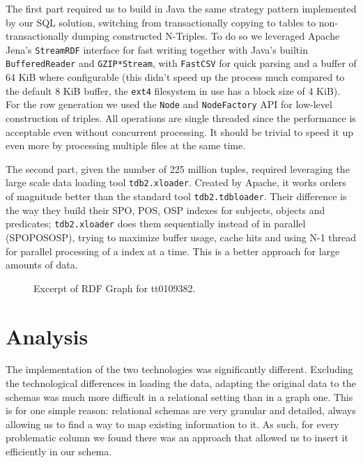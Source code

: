 \documentclass[a4paper,10pt]{article}
\begin{document}
The first part required us to build in Java the same strategy pattern
implemented by our SQL solution, switching from transactionally
copying to tables to non-transactionally dumping constructed
N-Triples. To do so we leveraged Apache Jena's \texttt{StreamRDF}
interface for fast writing together with Java's builtin
\texttt{BufferedReader} and \texttt{GZIP*Stream}, with
\texttt{FastCSV} for quick parsing and a buffer of 64 KiB where
configurable (this didn't speed up the process much compared to the
default 8 KiB buffer, the \texttt{ext4} filesystem in use has a block
size of 4 KiB). For the row generation we used the \texttt{Node} and
\texttt{NodeFactory} API for low-level construction of triples. All
operations are single threaded since the performance is acceptable
even without concurrent processing. It should be trivial to speed it
up even more by processing multiple files at the same time.

The second part, given the number of 225 million tuples, required
leveraging the large scale data loading tool \texttt{tdb2.xloader}.
Created by Apache, it works orders of magnitude better than the
standard tool \texttt{tdb2.tdbloader}. Their difference is the way
they build their SPO, POS, OSP indexes for subjects, objects and
predicates; \texttt{tdb2.xloader} does them sequentially instead of in
parallel (SPO\textrightarrow POS\textrightarrow OSP), trying to
maximize buffer usage, cache hits and using N-1 thread for parallel
processing of a index at a time. This is a better approach for large
amounts of data.

\begin{figure}
  \begin{centering}
    
    \caption[Excerpt of RDF Graph]{Excerpt of RDF Graph for tt0109382.}
    \label{fig:Excerpt of RDF Graph.}
  \end{centering}
\end{figure}

\section{Analysis}

The implementation of the two technologies was significantly
different. Excluding the technological differences in loading the
data, adapting the original data to the schemas was much more
difficult in a relational setting than in a graph one. This is for one
simple reason: relational schemas are very granular and detailed,
always allowing us to find a way to map existing information to it. As
such, for every problematic column we found there was an approach that
allowed us to insert it efficiently in our schema.
\end{document}
